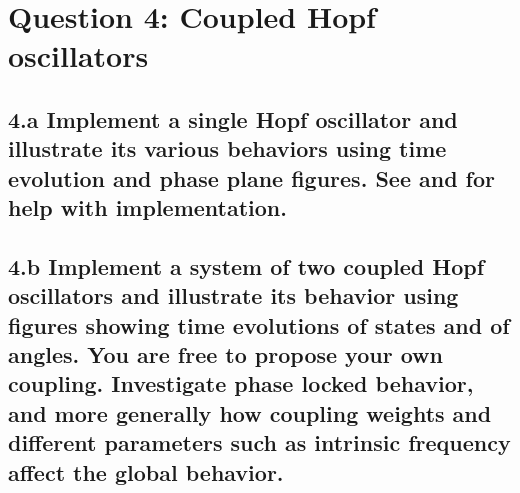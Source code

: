 \documentclass{cmc}
\begin{document}
\section*{Question 4: Coupled Hopf oscillators}

\subsection*{4.a Implement a single Hopf oscillator and illustrate its various
  behaviors using time evolution and phase plane figures. See
   and  for help with implementation.}


\subsection*{4.b Implement a system of two coupled Hopf oscillators and
  illustrate its behavior using figures showing time evolutions of states and of
  angles. You are free to propose your own coupling.  Investigate phase locked
  behavior, and more generally how coupling weights and different parameters
  such as intrinsic frequency affect the global behavior.}
\end{document}
